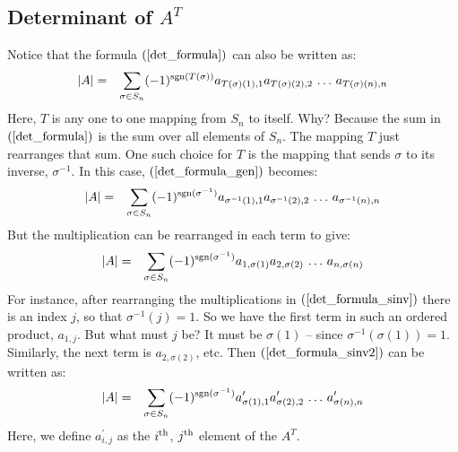 \documentclass{article}
\begin{document}
\subsection{Determinant of $A^T$}
Notice that the formula $(\ref{det_formula})$ can also be written as:
\begin{eqnarray}
  |A| & = & \sum_{\sigma \in S_n} (-1)^{{\rm sgn}(T(\sigma))}
            a_{T(\sigma)(1), 1} a_{T(\sigma)(2),2} \, \ldots \, a_{T(\sigma)(n), n}
            \label{det_formula_gen}
\end{eqnarray}
Here, $T$ is any one to one mapping from $S_n$ to itself. Why? Because the sum in
$(\ref{det_formula})$ is the sum over all elements of $S_n$. The mapping $T$ just
rearranges that sum. One such choice for $T$ is the mapping that sends $\sigma$
to its inverse, $\sigma^{-1}$. In this case, $(\ref{det_formula_gen})$ becomes:
\begin{eqnarray}
  |A| & = & \sum_{\sigma \in S_n} (-1)^{{\rm sgn}(\sigma^{-1})}
            a_{\sigma^{-1}(1), 1} a_{\sigma^{-1}(2),2} \, \ldots \, a_{\sigma^{-1}(n), n}
            \label{det_formula_sinv}
\end{eqnarray}
But the multiplication can be rearranged in each term to give:
\begin{eqnarray}
  |A| & = & \sum_{\sigma \in S_n} (-1)^{{\rm sgn}(\sigma^{-1})}
            a_{1, \sigma(1)}  a_{2, \sigma(2)} \, \ldots \, a_{n, \sigma(n)}
            \label{det_formula_sinv2}
\end{eqnarray}
For instance, after rearranging the multiplications in $(\ref{det_formula_sinv})$
there is an index $j$, so that
$\sigma^{-1}(j) = 1$. So we have the first term in such an ordered product, $a_{1,j}$.
But what must $j$ be? It must be $\sigma(1)$ -- since $\sigma^{-1}(\sigma(1)) = 1$.
Similarly, the next term is $a_{2, \sigma(2)}$, etc. Then $(\ref{det_formula_sinv2})$
can be written as:
\begin{eqnarray}
  |A| & = & \sum_{\sigma \in S_n} (-1)^{{\rm sgn}(\sigma^{-1})} a_{\sigma(1),1}^\prime
            a_{\sigma(2),2}^\prime \, \ldots \, a_{\sigma(n),n}^\prime \label{at_proto}
\end{eqnarray}
Here, we define $a_{i,j}^\prime$ as the $i^{\rm th}$, $j^{\rm th}$ element of the $A^T$.
\end{document}
